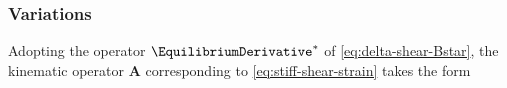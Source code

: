 \subsubsection{Variations}

Adopting the operator \(\EquilibriumDerivative^*\) of \eqref{eq:delta-shear-Bstar}, the kinematic operator \(\bm{A}\) corresponding to \eqref{eq:stiff-shear-strain} takes the form
